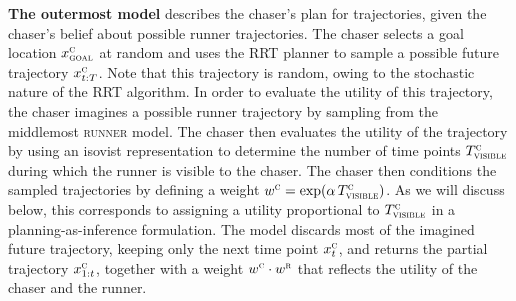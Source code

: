 \documentclass[twoside]{article}
\begin{document}
\textbf{The outermost model} describes the chaser's plan for trajectories, given the chaser's belief about possible runner trajectories. The chaser selects a goal location $x^\textsc{c}_\textsc{goal}$ at random and uses the RRT planner to sample a possible future trajectory $x^\textsc{c}_{t:T}$. Note that this trajectory is random, owing to the stochastic nature of the RRT algorithm. In order to evaluate the utility of this trajectory, the chaser imagines a possible runner trajectory by sampling from the middlemost \textsc{runner} model. The chaser then evaluates the utility of the trajectory by using an isovist representation to determine the number of time points $T^\textsc{c}_\textsc{visible}$ during which the runner is visible to the chaser. The chaser then conditions the sampled trajectories by defining a weight $w^\textsc{c} = \exp( \alpha \, T^\textsc{c}_\textsc{visible})$. As we will discuss below, this corresponds to assigning a utility proportional to $T^\textsc{c}_\textsc{visible}$ in a planning-as-inference formulation. The model discards most of the imagined future trajectory, keeping only the next time point $x^\textsc{c}_t$, and returns the partial trajectory $x^\textsc{c}_{1:t}$, together with a weight $w^\textsc{c} \cdot w^\textsc{r}$ that reflects the utility of the chaser and the runner.
\end{document}
